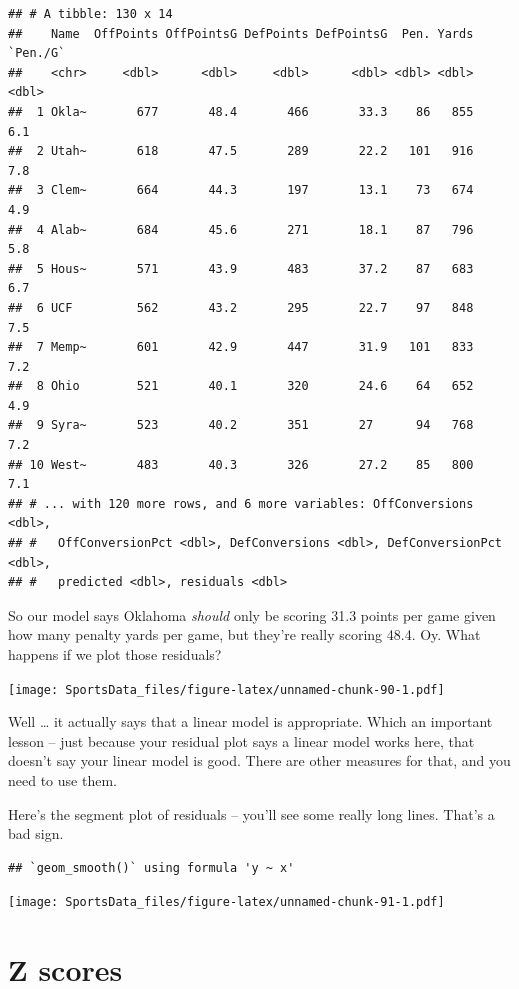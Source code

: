 \documentclass[]{book}
\begin{document}
\begin{verbatim}
## # A tibble: 130 x 14
##    Name  OffPoints OffPointsG DefPoints DefPointsG  Pen. Yards `Pen./G`
##    <chr>     <dbl>      <dbl>     <dbl>      <dbl> <dbl> <dbl>    <dbl>
##  1 Okla~       677       48.4       466       33.3    86   855      6.1
##  2 Utah~       618       47.5       289       22.2   101   916      7.8
##  3 Clem~       664       44.3       197       13.1    73   674      4.9
##  4 Alab~       684       45.6       271       18.1    87   796      5.8
##  5 Hous~       571       43.9       483       37.2    87   683      6.7
##  6 UCF         562       43.2       295       22.7    97   848      7.5
##  7 Memp~       601       42.9       447       31.9   101   833      7.2
##  8 Ohio        521       40.1       320       24.6    64   652      4.9
##  9 Syra~       523       40.2       351       27      94   768      7.2
## 10 West~       483       40.3       326       27.2    85   800      7.1
## # ... with 120 more rows, and 6 more variables: OffConversions <dbl>,
## #   OffConversionPct <dbl>, DefConversions <dbl>, DefConversionPct <dbl>,
## #   predicted <dbl>, residuals <dbl>
\end{verbatim}

So our model says Oklahoma \emph{should} only be scoring 31.3 points per game given how many penalty yards per game, but they're really scoring 48.4. Oy. What happens if we plot those residuals?

\texttt{[image: SportsData\_files/figure-latex/unnamed-chunk-90-1.pdf]}

Well \ldots{} it actually says that a linear model is appropriate. Which an important lesson -- just because your residual plot says a linear model works here, that doesn't say your linear model is good. There are other measures for that, and you need to use them.

Here's the segment plot of residuals -- you'll see some really long lines. That's a bad sign.

\begin{verbatim}
## `geom_smooth()` using formula 'y ~ x'
\end{verbatim}

\texttt{[image: SportsData\_files/figure-latex/unnamed-chunk-91-1.pdf]}

\hypertarget{z-scores}{%
\chapter{Z scores}\label{z-scores}}
\end{document}
